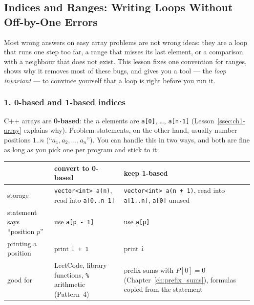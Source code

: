 \subsection{Indices and Ranges: Writing Loops Without Off-by-One Errors}
\label{ssec:ch1-indices}

Most wrong answers on easy array problems are not wrong ideas: they are a loop that runs one step too far, a range that misses its last element, or a comparison with a neighbour that does not exist. This lesson fixes one convention for ranges, shows why it removes most of these bugs, and gives you a tool --- the \emph{loop invariant} --- to convince yourself that a loop is right before you run it.

\subsubsection*{1. 0-based and 1-based indices}

C++ arrays are \textbf{0-based}: the $n$ elements are \texttt{a[0]}, \ldots, \texttt{a[n-1]} (Lesson~\ref{ssec:ch1-array} explains why). Problem statements, on the other hand, usually number positions $1..n$ (``$a_1, a_2, \dots, a_n$''). You can handle this in two ways, and both are fine as long as you pick one per program and stick to it:

\begin{table}[H]
\centering\small
\renewcommand{\arraystretch}{1.2}
\begin{tabularx}{\linewidth}{@{}>{\raggedright\arraybackslash}p{3.5cm} X X@{}}
\toprule
 & \textbf{convert to 0-based} & \textbf{keep 1-based} \\
\midrule
storage & \texttt{vector<int> a(n)}, read into \texttt{a[0..n-1]} & \texttt{vector<int> a(n + 1)}, read into \texttt{a[1..n]}, \texttt{a[0]} unused \\
statement says ``position $p$'' & use \texttt{a[p - 1]} & use \texttt{a[p]} \\
printing a position & print \texttt{i + 1} & print \texttt{i} \\
good for & LeetCode, library functions, \texttt{\%} arithmetic (Pattern~4) & prefix sums with $P[0] = 0$ (Chapter~\ref{ch:prefix_sums}), formulas copied from the statement \\
\bottomrule
\end{tabularx}
\end{table}

